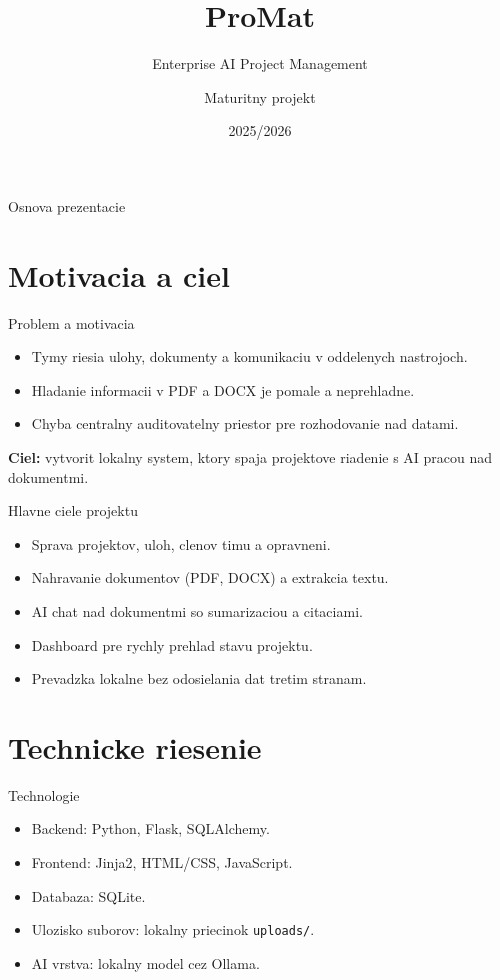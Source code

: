\documentclass[aspectratio=169]{beamer}
\title{ProMat}
\subtitle{Enterprise AI Project Management}
\author{Maturitny projekt}
\institute{SPSE Zochova 9, Bratislava}
\date{2025/2026}
\begin{document}
\begin{frame}
  \titlepage
\end{frame}

\begin{frame}{Osnova prezentacie}
  \tableofcontents
\end{frame}

\section{Motivacia a ciel}
\begin{frame}{Problem a motivacia}
  \begin{itemize}
    \item Tymy riesia ulohy, dokumenty a komunikaciu v oddelenych nastrojoch.
    \item Hladanie informacii v PDF a DOCX je pomale a neprehladne.
    \item Chyba centralny auditovatelny priestor pre rozhodovanie nad datami.
  \end{itemize}
  \vspace{0.4cm}
  \textbf{Ciel:} vytvorit lokalny system, ktory spaja projektove riadenie s AI pracou nad dokumentmi.
\end{frame}

\begin{frame}{Hlavne ciele projektu}
  \begin{itemize}
    \item Sprava projektov, uloh, clenov timu a opravneni.
    \item Nahravanie dokumentov (PDF, DOCX) a extrakcia textu.
    \item AI chat nad dokumentmi so sumarizaciou a citaciami.
    \item Dashboard pre rychly prehlad stavu projektu.
    \item Prevadzka lokalne bez odosielania dat tretim stranam.
  \end{itemize}
\end{frame}

\section{Technicke riesenie}
\begin{frame}{Technologie}
  \begin{itemize}
    \item Backend: Python, Flask, SQLAlchemy.
    \item Frontend: Jinja2, HTML/CSS, JavaScript.
    \item Databaza: SQLite.
    \item Ulozisko suborov: lokalny priecinok \texttt{uploads/}.
    \item AI vrstva: lokalny model cez Ollama.
  \end{itemize}
\end{frame}
\end{document}
